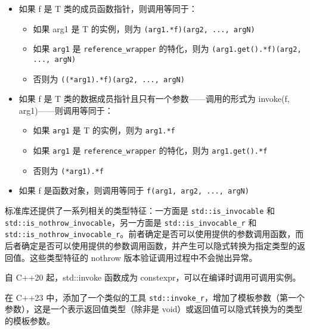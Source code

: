 \begin{itemize}
\item
如果 f 是 T 类的成员函数指针，则调用等同于：

\begin{itemize}
\item
如果 arg1 是 T 的实例，则为 \verb|(arg1.*f)(arg2, ..., argN)|

\item
如果 \verb|arg1| 是 \verb|reference_wrapper| 的特化，则为 \verb|(arg1.get().*f)(arg2, ..., argN)|

\item
否则为 \verb|((*arg1).*f)(arg2, ..., argN)|
\end{itemize}

\item
如果 f 是 T 类的数据成员指针且只有一个参数——调用的形式为 invoke(f, arg1)——则调用等同于：

\begin{itemize}
\item
如果 \verb|arg1| 是 T 的实例，则为 \verb|arg1.*f|

\item
如果 \verb|arg1| 是 \verb|reference_wrapper| 的特化，则为 \verb|arg1.get().*f|

\item
否则为 \verb|(*arg1).*f|
\end{itemize}

\item
如果 f 是函数对象，则调用等同于 \verb|f(arg1, arg2, ..., argN)|
\end{itemize}

标准库还提供了一系列相关的类型特征：一方面是 \verb|std::is_invocable| 和 \verb|std::is_nothrow_invocable|，另一方面是 \verb|std::is_invocable_r| 和 \verb|std::is_nothrow_invocable_r|。前者确定是否可以使用提供的参数调用函数，而后者确定是否可以使用提供的参数调用函数，并产生可以隐式转换为指定类型的返回值。这些类型特征的 nothrow 版本验证调用过程中不会抛出异常。

自 C++20 起，std::invoke 函数成为 constexpr，可以在编译时调用可调用实例。

在 C++23 中，添加了一个类似的工具 \verb|std::invoke_r|，增加了模板参数（第一个参数），这是一个表示返回值类型（除非是 void）或返回值可以隐式转换为的类型的模板参数。

